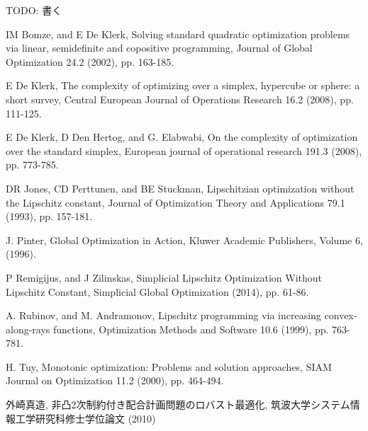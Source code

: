 \documentclass[a4paper,11pt]{jreport}
\begin{document}
TODO: 書く

\newpage

\renewcommand{\bibname}{参考文献}

\begin{thebibliography}{1}

IM Bomze, and E De Klerk,
\newblock Solving standard quadratic optimization problems via linear, semidefinite and copositive programming,
\newblock Journal of Global Optimization 24.2 (2002), pp. 163-185.

E De Klerk,
\newblock The complexity of optimizing over a simplex, hypercube or sphere: a short survey,
\newblock Central European Journal of Operations Research 16.2 (2008), pp. 111-125.

E De Klerk, D Den Hertog, and G. Elabwabi,
\newblock On the complexity of optimization over the standard simplex,
\newblock European journal of operational research 191.3 (2008), pp. 773-785.

DR Jones, CD Perttunen, and BE Stuckman,
\newblock Lipschitzian optimization without the Lipschitz constant,
\newblock Journal of Optimization Theory and Applications 79.1 (1993), pp. 157-181.

J. Pinter,
\newblock Global Optimization in Action,
\newblock Kluwer Academic Publishers, Volume 6, (1996).

P Remigijus, and J Zilinskas,
\newblock Simplicial Lipschitz Optimization Without Lipschitz Constant,
\newblock Simplicial Global Optimization (2014), pp. 61-86.

A. Rubinov, and M. Andramonov,
\newblock Lipschitz programming via increasing convex-along-rays functions,
\newblock Optimization Methods and Software 10.6 (1999), pp. 763-781.

H. Tuy,
\newblock Monotonic optimization: Problems and solution approaches,
\newblock SIAM Journal on Optimization 11.2 (2000), pp. 464-494.

外崎真造,
\newblock 非凸2次制約付き配合計画問題のロバスト最適化,
\newblock 筑波大学システム情報工学研究科修士学位論文 (2010)
\end{thebibliography}
\end{document}
